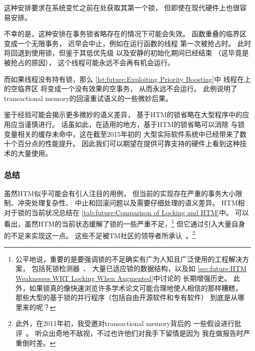 \begin{fcvref}
这种安排要求在系统变忙之前在处获取其第一个锁，
但即使在现代硬件上也很容易安排。

不幸的是，这种安排在事务锁省略存在的情况下可能会失效。
函数重叠的临界区变成一个无限事务，
迟早会中止，例如在运行函数的线程
第一次被抢占时。
此时将回退到使用锁，但鉴于其低优先级
以及安静的初始化期间已经结束
（这毕竟是被抢占的原因），
这个线程可能永远不会再有机会运行。

而如果线程没有持有锁，那么
\cref{lst:future:Exploiting Priority Boosting}中
线程在上的空临界区
将变成一个没有效果的空事务，
从而永远不会运行。
此例说明了transactional memory的回滚重试语义的一些微妙后果。
\end{fcvref}

鉴于经验可能会揭示更多微妙的语义差异，
基于HTM的锁省略在大型程序中的应用应当谨慎进行。
话虽如此，在适用的地方，基于HTM的锁省略可以消除
与锁变量相关的缓存未命中，这在截至2015年初的
大型实际软件系统中已经带来了数十个百分点的性能提升。
因此我们可以期望在提供可靠支持的硬件上看到这种技术的大量使用。

\QuickQuizEnd

\subsubsection{总结}
\label{sec:future:HTM Weaknesses WRT Locking: Summary}



虽然HTM似乎可能会有引人注目的用例，
但当前的实现存在严重的事务大小限制、冲突处理复杂性、
中止和回滚问题以及需要仔细处理的语义差异。
HTM相对于锁的当前状况总结在
\cref{tab:future:Comparison of Locking and HTM}中。
可以看出，虽然HTM的当前状态缓解了锁的一些严重不足，\footnote{
	公平地说，重要的是要强调锁的不足确实有广为人知且广泛使用的工程解决方案，
	包括死锁检测器~\cite{JonathanCorbet2006lockdep}、
	大量已适应锁的数据结构，以及如
	\cref{sec:future:HTM Weaknesses WRT Locking When Augmented}中讨论的
	长期增强历史。
	此外，如果锁真的像快速浏览许多学术论文可能合理地使人相信的那样糟糕，
	那些大型的基于锁的并行程序（包括自由开源软件和专有软件）
	到底是从哪里来的呢？}
但它通过引入大量自身的不足来实现这一点。
这些不足被TM社区的领导者所承认~\cite{AlexanderMatveev2012PessimisticTM}。\footnote{
	此外，在2011年初，我受邀对transactional memory背后的
	一些假设进行批评~\cite{PaulEMcKenney2011Verico}。
	听众出奇地不敌视，不过也许他们对我手下留情是因为
	我在做报告时严重倒时差。}

